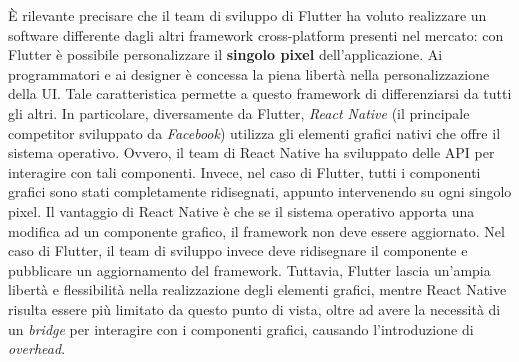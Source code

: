 È rilevante precisare che il team di sviluppo di Flutter ha voluto realizzare un software differente dagli altri framework cross-platform presenti nel mercato: con Flutter è possibile personalizzare il \textbf{singolo pixel} dell'applicazione. Ai programmatori e ai designer è concessa la piena libertà nella personalizzazione della UI. Tale caratteristica permette a questo framework di differenziarsi da tutti gli altri. In particolare, diversamente da Flutter, \textit{React Native} (il principale competitor sviluppato da \textit{Facebook}) utilizza gli elementi grafici nativi che offre il sistema operativo. Ovvero, il team di React Native ha sviluppato delle API per interagire con tali componenti. Invece, nel caso di Flutter, tutti i componenti grafici sono stati completamente ridisegnati, appunto intervenendo su ogni singolo pixel. Il vantaggio di React Native è che se il sistema operativo apporta una modifica ad un componente grafico, il framework non deve essere aggiornato. Nel caso di Flutter, il team di sviluppo invece deve ridisegnare il componente e pubblicare un aggiornamento del framework. Tuttavia, Flutter lascia un'ampia libertà e flessibilità nella realizzazione degli elementi grafici, mentre React Native risulta essere più limitato da questo punto di vista, oltre ad avere la necessità di un \textit{bridge} per interagire con i componenti grafici, causando l'introduzione di \textit{overhead}.

